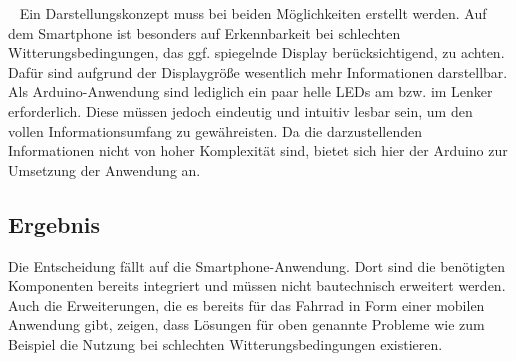 \begin{description}[leftmargin=0.7cm,style=nextline]
  \item[Darstellung] ~ Ein Darstellungskonzept muss bei beiden Möglichkeiten erstellt werden. Auf dem \gls{Smartphone} ist besonders auf Erkennbarkeit bei schlechten Witterungsbedingungen, das ggf. spiegelnde Display berücksichtigend, zu achten. Dafür sind aufgrund der Displaygröße wesentlich mehr Informationen darstellbar. Als \gls{Arduino}-Anwendung sind lediglich ein paar helle \glspl{LED} am bzw. im Lenker erforderlich. Diese müssen jedoch eindeutig und intuitiv lesbar sein, um den vollen Informationsumfang zu gewähreisten. Da die darzustellenden Informationen nicht von hoher Komplexität sind, bietet sich hier der Arduino zur Umsetzung der Anwendung an. \\
\end{description}
\subsection*{Ergebnis}  
Die Entscheidung fällt auf die \gls{Smartphone}-Anwendung. Dort sind die benötigten Komponenten bereits integriert und müssen nicht bautechnisch erweitert werden. Auch die Erweiterungen, die es bereits für das Fahrrad in Form einer mobilen Anwendung gibt, zeigen, dass Lösungen für oben genannte Probleme wie zum Beispiel die Nutzung bei schlechten Witterungsbedingungen existieren.
